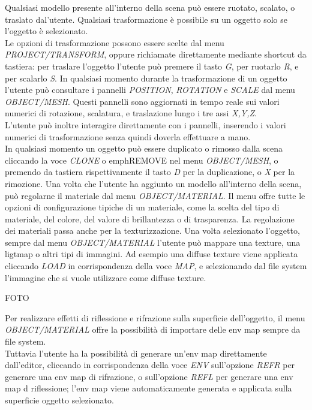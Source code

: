Qualsiasi modello presente all’interno della scena può essere ruotato, scalato, o traslato dal’utente. Qualsiasi trasformazione è possibile su un oggetto solo se l’oggetto è selezionato.
\\
Le opzioni di trasformazione possono essere scelte dal menu \emph{PROJECT/TRANSFORM}, oppure richiamate direttamente mediante shortcut da tastiera: per traslare l’oggetto l’utente può premere il tasto \emph{G}, per ruotarlo \emph{R}, e per scalarlo \emph{S}. In qualsiasi momento durante la trasformazione di un oggetto l’utente può consultare i pannelli \emph{POSITION}, \emph{ROTATION} e \emph{SCALE} dal menu \emph{OBJECT/MESH}. Questi pannelli sono aggiornati in tempo reale sui valori numerici di rotazione, scalatura, e traslazione lungo i tre assi \emph{X,Y,Z}. 
\\
L’utente può inoltre interagire direttamente con i pannelli, inserendo i valori numerici di trasformazione senza quindi doverla effettuare a mano.
\\
In qualsiasi momento un oggetto può essere duplicato o rimosso dalla scena cliccando la voce \emph{CLONE} o emph{REMOVE} nel menu \emph{OBJECT/MESH}, o premendo da tastiera rispettivamente il tasto \emph{D} per la duplicazione, o \emph{X} per la rimozione.
Una volta che l’utente ha aggiunto un modello all’interno della scena, può regolarne il materiale dal menu \emph{OBJECT/MATERIAL}. Il menu offre tutte le opzioni di configurazione tipiche di un materiale, come la scelta del tipo di materiale, del colore, del valore di brillantezza o di trasparenza. 
La regolazione dei materiali passa anche per la texturizzazione. 
Una volta selezionato l’oggetto, sempre dal menu \emph{OBJECT/MATERIAL} l’utente può mappare una texture, una ligtmap o altri tipi di immagini. Ad esempio una diffuse texture viene applicata cliccando \emph{LOAD} in corrispondenza della voce \emph{MAP}, e selezionando dal file system l’immagine che si vuole utilizzare come diffuse texture. 


FOTO


Per realizzare effetti di riflessione e rifrazione sulla superficie dell’oggetto, il menu \emph{OBJECT/MATERIAL} offre la possibilità di importare delle env map sempre da file system. 
\\
Tuttavia l’utente ha la possibilità di generare un’env map direttamente dall’editor, cliccando in corrispondenza della voce \emph{ENV} sull’opzione \emph{REFR} per generare una env map di rifrazione, o sull’opzione \emph{REFL} per generare una env map d riflessione; l’env map viene automaticamente generata e applicata sulla superficie oggetto selezionato.


